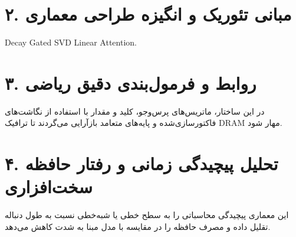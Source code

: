 \documentclass[12pt,a4paper]{article}
\begin{document}
\section*{۲. مبانی تئوریک و انگیزه طراحی معماری}
Decay Gated SVD Linear Attention.

\section*{۳. روابط و فرمول‌بندی دقیق ریاضی}
در این ساختار، ماتریس‌های پرس‌وجو، کلید و مقدار با استفاده از نگاشت‌های فاکتورسازی‌شده و پایه‌های متعامد بازآرایی می‌گردند تا ترافیک DRAM مهار شود.

\section*{۴. تحلیل پیچیدگی زمانی و رفتار حافظه سخت‌افزاری}
این معماری پیچیدگی محاسباتی را به سطح خطی یا شبه‌خطی نسبت به طول دنباله تقلیل داده و مصرف حافظه را در مقایسه با مدل مبنا به شدت کاهش می‌دهد.
\end{document}
